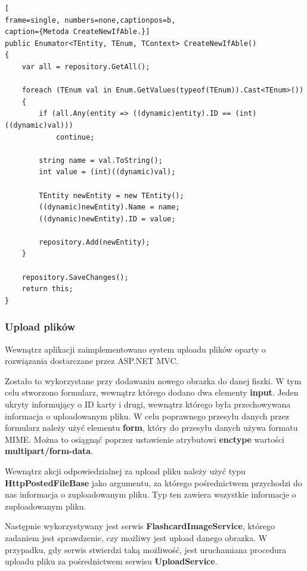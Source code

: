 \begin{minipage}{\linewidth}
\begin{lstlisting}[
frame=single, numbers=none,captionpos=b, 
caption={Metoda CreateNewIfAble.}]
public Enumator<TEntity, TEnum, TContext> CreateNewIfAble()
{
	var all = repository.GetAll();

	foreach (TEnum val in Enum.GetValues(typeof(TEnum)).Cast<TEnum>())
	{
		if (all.Any(entity => ((dynamic)entity).ID == (int)((dynamic)val)))
			continue;

		string name = val.ToString();
		int value = (int)((dynamic)val);

		TEntity newEntity = new TEntity();
		((dynamic)newEntity).Name = name;
		((dynamic)newEntity).ID = value;

		repository.Add(newEntity);
	}

	repository.SaveChanges();
	return this;
}
\end{lstlisting}
\end{minipage}

\subsubsection{Upload plików}

Wewnątrz aplikacji zaimplementowano system uploadu plików oparty o rozwiązania dostarczane przez ASP.NET MVC. 

Zostało to wykorzystane przy dodawaniu nowego obrazka do danej fiszki.
W tym celu stworzono formularz, wewnątrz którego dodano dwa elementy \textbf{input}. Jeden ukryty informujący o ID karty i drugi, wewnątrz którego była przechowywana informacja o uploadowanym pliku. W celu poprawnego przesyłu danych przez formularz należy użyć elementu \textbf{form}, który do przesyłu danych używa formatu MIME. Można to osiągnąć poprzez ustawienie atrybutowi \textbf{enctype} wartości \textbf{multipart/form-data}.

Wewnątrz akcji odpowiedzialnej za upload pliku należy użyć typu \textbf{HttpPostedFileBase} jako argumentu, za którego pośrednictwem przychodzi do nas informacja o zuploadowanym pliku. Typ ten zawiera wszystkie informacje o zuploadowanym pliku. 

Następnie wykorzystywany jest serwis \textbf{FlashcardImageService}, którego zadaniem jest sprawdzenie, czy możliwy jest upload danego obrazka. W przypadku, gdy serwis stwierdzi taką możliwość, jest uruchamiana procedura uploadu pliku za pośrednictwem serwisu \textbf{UploadService}.

